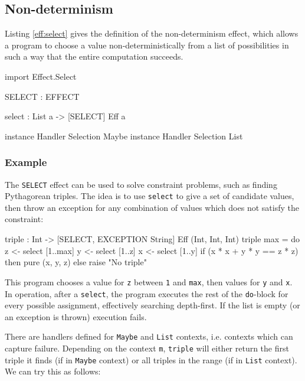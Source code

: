 \subsection{Non-determinism}

Listing \ref{eff:select} gives the definition of the non-determinism effect,
which allows a program to choose a value non-deterministically from a list
of possibilities in such a way that the entire computation succeeds.

\begin{code}[float=h,frame=single,label=eff:select,caption={Non-determinism Effect}]
import Effect.Select

SELECT : EFFECT

select : List a -> { [SELECT] } Eff a 

instance Handler Selection Maybe
instance Handler Selection List
\end{code}

\subsubsection*{Example}

The \texttt{SELECT} effect can be used to solve constraint problems, such as
finding Pythagorean triples. The idea is to use \texttt{select} to give a
set of candidate values, then throw an exception for any combination of values
which does not satisfy the constraint:

\begin{code}
triple : Int -> { [SELECT, EXCEPTION String] } Eff (Int, Int, Int)
triple max = do z <- select [1..max]
                y <- select [1..z]
                x <- select [1..y]
                if (x * x + y * y == z * z)
                   then pure (x, y, z)
                   else raise "No triple"
\end{code}

\noindent
This program chooses a value for \texttt{z} between \texttt{1} and \texttt{max},
then values for \texttt{y} and \texttt{x}. In operation, after a
\texttt{select}, the program executes the rest of the \texttt{do}-block for
every possible assignment, effectively searching depth-first. If the list
is empty (or an exception is thrown) execution fails.

There are handlers defined for \texttt{Maybe} and \texttt{List} contexts,
i.e. contexts which can capture failure.
Depending on the context \texttt{m}, \texttt{triple} will either return the
first triple it finds (if in \texttt{Maybe} context) or all triples in the
range (if in \texttt{List} context). We can try this as follows:

